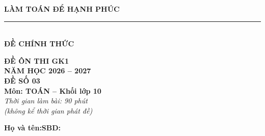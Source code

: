 \documentclass[12pt,a4paper]{article}
\begin{document}
\noindent
\begin{minipage}[c]{0.38\textwidth}
    \centering
    \textbf{LÀM TOÁN ĐỂ HẠNH PHÚC}\\[-2pt]
    \rule{3.2cm}{0.6pt}\\[4pt]
    \textbf{ĐỀ CHÍNH THỨC}
\end{minipage}\hfill
\begin{minipage}[c]{0.35\textwidth}
    \centering
    \textbf{ĐỀ ÔN THI GK1}\\
    \textbf{NĂM HỌC 2026 -- 2027}\\[2pt]
    \textbf{ĐỀ SỐ 03}\\
    \textbf{Môn: TOÁN -- Khối lớp 10}\\
    \textit{\small Thời gian làm bài: 90 phút\\(không kể thời gian phát đề)}
\end{minipage}

\vspace{0.2cm}
\noindent
\begin{minipage}[b]{0.78\textwidth}
    \textbf{Họ và tên:}\dotfill\textbf{SBD:}\makebox[3.5cm]{\dotfill}
\end{minipage}\hfill
\begin{minipage}[b]{0.20\textwidth}
    \hfill
    \setlength{\fboxrule}{0.8pt}%
\end{minipage}
\vspace{0.2cm}
\end{document}
